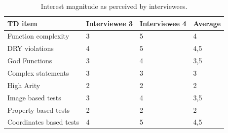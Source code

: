 \begin{table}[!htbp]
	\centering
	\tabulinesep=1.2mm
	\begin{tabu} to \textwidth {|X[2]|X|X|X|}

		\hline
		\textbf{TD item} & \textbf{Interviewee 3} & \textbf{Interviewee 4}  & \textbf{Average} \\
		\hline

		Function complexity & 3 & 5 & 4 \\
		\hline

		DRY violations & 4 & 5 & 4,5 \\
		\hline

		God Functions & 3 & 4 & 3,5 \\
		\hline

		Complex statements & 3 & 3 & 3 \\
		\hline

		High Arity & 2 & 2 & 2 \\
		\hline

		Image based tests & 3 & 4 & 3,5 \\
		\hline

		Property based tests & 2 & 2 & 2 \\
		\hline

		Coordinates based tests & 4 & 5 & 4,5 \\
		\hline

	\end{tabu}
	\caption{Interest magnitude as perceived by interviewees.}
	\label{tab:interest_magnitude}
\end{table}


